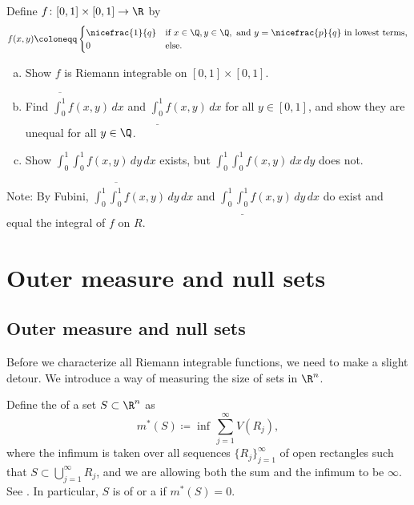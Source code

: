 \begin{exercise}
Define $f \colon [0,1] \times [0,1] \to \R$ by
\begin{equation*}
f(x,y) \coloneqq
\begin{cases}
\nicefrac{1}{q} & \text{if } x \in \Q, y \in \Q, \text{ and }
  y=\nicefrac{p}{q} \text{ in lowest terms,} \\
0               & \text{else.} 
\end{cases}
\end{equation*}
\begin{enumerate}[a)]
\item
Show $f$ is Riemann integrable on $[0,1] \times [0,1]$.
\item
Find 
$\overline{\int_0^1} f(x,y) \, dx$ and
$\underline{\int_0^1} f(x,y) \, dx$ for all $y \in [0,1]$, and show they are unequal for all $y
\in \Q$.
\item
Show
$\int_0^1 \int_0^1 f(x,y) \, dy \, dx$ exists, but
   $\int_0^1 \int_0^1 f(x,y) \, dx \, dy$ does not.
\end{enumerate}
Note: By Fubini,
$\int_0^1 \overline{\int_0^1} f(x,y) \, dy \, dx$ and 
$\int_0^1 \underline{\int_0^1} f(x,y) \, dy \, dx$ do exist and equal the
integral of $f$ on $R$.
\end{exercise}


\sectionnewpage
\section{Outer measure and null sets}
\label{sec:outermeasure}



\subsection{Outer measure and null sets}

Before we characterize all Riemann integrable functions, we need to make
a slight detour.  We introduce a way of measuring the size of sets in $\R^n$.

\begin{defn}
Define the \emph{}
of a set $S \subset \R^n$ as
\begin{equation*}
m^*(S)
\coloneqq
\inf\,
\sum_{j=1}^\infty V(R_j) ,
\end{equation*}
where the infimum is taken over all sequences
$\{ R_j \}_{j=1}^\infty$ of open rectangles such that
$S \subset \bigcup_{j=1}^\infty R_j$,
and we are allowing both the sum and the infimum to be $\infty$.
See .
In particular, $S$ is of \emph{} or
a \emph{} if $m^*(S) = 0$.
\end{defn}

